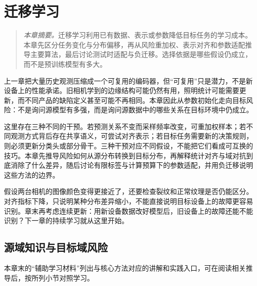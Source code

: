 ﻿\chapter{迁移学习}
\label{chap:transfer}
\begin{quote}\small
\textit{本章摘要。}迁移学习利用已有数据、表示或参数降低目标任务的学习成本。本章先区分任务变化与分布偏移，再从风险重加权、表示对齐和参数适配推导主要算法，最后讨论测试时适配与负迁移。选择依据是哪些假设仍成立，而不是预训练模型有多大。
\end{quote}

上一章把大量历史观测压缩成一个可复用的编码器，但“可复用”只是潜力，不是新设备上的性能承诺。旧相机学到的边缘结构可能仍然有用，照明统计可能需要更新，而不同产品的缺陷定义甚至可能不再相同。本章因此从参数初始化走向目标风险：不是询问源模型有多强，而是询问源数据中的哪些关系在目标环境中仍成立。

这里存在三种不同的干预。若预测关系不变而采样频率改变，可重加权样本；若不同观测方式背后存在共享语义，可尝试对齐表示；若目标任务需要新的决策规则，则必须更新分类头或部分骨干。三种干预对应不同假设，不能把它们看成可互换的技巧。本章先推导风险如何从源分布转换到目标分布，再解释统计对齐与域对抗到底消除了什么差异，随后讨论有限标签与计算预算下的参数适配，并用负迁移说明这些方法的边界。

假设两台相机的图像颜色变得更接近了，还要检查裂纹和正常纹理是否仍能区分。对齐指标下降，只说明某种分布差异缩小，不能直接说明目标设备上的故障更容易识别。章末再考虑连续更新：用新设备数据改好模型后，旧设备上的故障还能不能识别？下一章的持续学习就从这里开始。

\section{源域知识与目标域风险}

本章末的“辅助学习材料”列出与核心方法对应的讲解和实践入口，可在阅读相关推导后，按所列小节对照学习。

